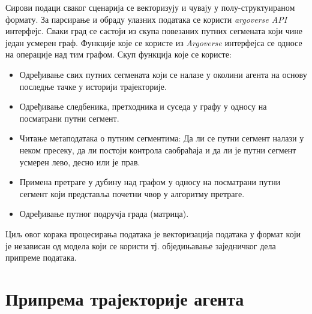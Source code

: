\documentclass[11pt,oneside]{memoir}
\begin{document}
Сирови подаци сваког сценарија се векторизују и чувају у полу-структуираном формату. 
За парсирање и обраду улазних података се користи \textit{argoverse API} интерфејс. Сваки град се састоји из скупа
повезаних путних сегмената који чине један усмерен граф. Функције које се користе из \textit{Argoverse} интерфејса се 
односе на операције над тим графом. Скуп функција које се користе:
\begin{itemize}
  \item Одређивање свих путних сегмената који се налазе у околини агента на основу последње тачке у историји трајекторије.
  \item Одређивање следбеника, претходника и суседа у графу у односу на посматрани путни сегмент.
  \item Читање метаподатака о путним сегментима: Да ли се путни сегмент налази у неком пресеку, да ли постоји контрола саобраћаја и
        да ли је путни сегмент усмерен лево, десно или је прав.
  \item Примена претраге у дубину над графом у односу на посматрани путни сегмент који представља почетни чвор у алгоритму претраге.
  \item Одређивање путног подручја града (матрица).
\end{itemize}

Циљ овог корака процесирања података је векторизација података у формат који је независан од модела који се користи тј.
обједињавање заједничког дела припреме података.

\section{Припрема трајекторије агента}
\end{document}

